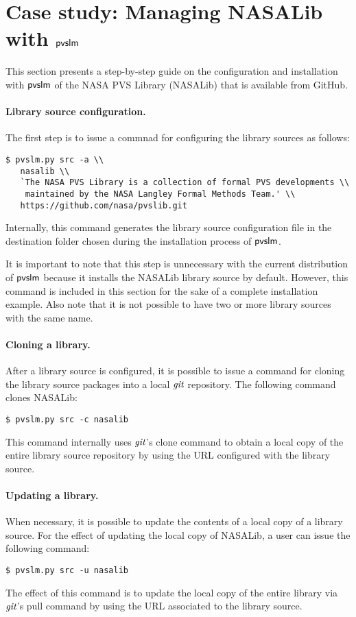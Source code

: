 \section{Case study: Managing NASALib with $\textsf{pvslm}$}
\label{sec.nasalib}

This section presents a step-by-step guide on the configuration and
installation with $\textsf{pvslm}$ of the NASA PVS Library (NASALib) that is
available from GitHub.

\paragraph{Library source configuration.}
The first step is to issue a commnad for configuring the library sources
as follows:
%
{\small\begin{verbatim}
$ pvslm.py src -a \\
   nasalib \\
   `The NASA PVS Library is a collection of formal PVS developments \\
    maintained by the NASA Langley Formal Methods Team.' \\
   https://github.com/nasa/pvslib.git
\end{verbatim}}
%
Internally, this command generates the library source
configuration file in the destination folder chosen during the
installation process of $\textsf{pvslm}$.

It is important to note that this step is unnecessary with the current
distribution of $\textsf{pvslm}$ because it installs the NASALib library
source by default.  However, this command is included in this section
for the sake of a complete installation example. Also note that it is
not possible to have two or more library sources with the same name.

\paragraph{Cloning a library.} After a library source
is configured, it is possible to issue a command for cloning the
library source packages into a local $\textit{git}$ repository. The following
command clones NASALib:
%
\begin{verbatim}
$ pvslm.py src -c nasalib
\end{verbatim}
%
This command internally uses $\textit{git}$'s clone command to obtain a local
copy of the entire library source repository by using the URL
configured with the library source.

\paragraph{Updating a library.} When necessary, it is possible to update
the contents of a local copy of a library source. For the effect of
updating the local copy of NASALib, a user can issue the following
command:
%
\begin{verbatim}
$ pvslm.py src -u nasalib
\end{verbatim}
%
The effect of this command is to update the local copy of the entire
library via $\textit{git}$'s pull command by using the URL associated to
the library source.

